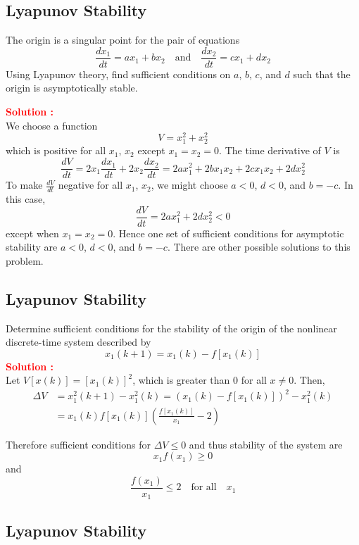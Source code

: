 \documentclass[12pt]{article}
\begin{document}
\subsection{Lyapunov Stability}

The origin is a singular point for the pair of equations
\[
\frac{dx_1}{dt} = ax_1 + bx_2 \quad \text{and} \quad \frac{dx_2}{dt} = cx_1 + dx_2
\]
Using Lyapunov theory, find sufficient conditions on \(a\), \(b\), \(c\), and \(d\) such that the origin is asymptotically stable.

\textbf{\textcolor{red}{Solution :}} \\
We choose a function
\[ V = x_1^2 + x_2^2 \]
which is positive for all \(x_1\), \(x_2\) except \(x_1 = x_2 = 0\). The time derivative of \(V\) is
\[
\frac{dV}{dt} = 2x_1 \frac{dx_1}{dt} + 2x_2 \frac{dx_2}{dt} = 2ax_1^2 + 2bx_1x_2 + 2cx_1x_2 + 2dx_2^2
\]
To make \(\frac{dV}{dt}\) negative for all \(x_1\), \(x_2\), we might choose \(a < 0\), \(d < 0\), and \(b = -c\). In this case,
\[
\frac{dV}{dt} = 2ax_1^2 + 2dx_2^2 < 0
\]
except when \(x_1 = x_2 = 0\). Hence one set of sufficient conditions for asymptotic stability are \(a < 0\), \(d < 0\), and \(b = -c\). There are other possible solutions to this problem.
\clearpage

\subsection{Lyapunov Stability}

Determine sufficient conditions for the stability of the origin of the nonlinear discrete-time system described by
\[ x_1(k+1) = x_1(k) - f[x_1(k)] \]
\textbf{\textcolor{red}{Solution :}} \\
Let \(V[x(k)] = [x_1(k)]^2\), which is greater than \(0\) for all \(x \neq 0\). Then, 
\begin{align}
    \Delta V &= x_1^2(k+1) - x_1^2(k) = (x_1(k)-f[x_1(k)])^2 -x_1^2(k) \\
        & = x_1(k)f[x_1(k)]\left( \frac{f[x_1(k)]}{x_1}-2\right)
\end{align}

Therefore sufficient conditions for \(\Delta V \leq 0\) and thus stability of the system are
\[ x_1f(x_1) \geq 0 \]
and
\[ \frac{f(x_1)}{x_1} \leq 2 \quad \text{for all} \quad x_1\]
\clearpage

\subsection{Lyapunov Stability}
\end{document}
